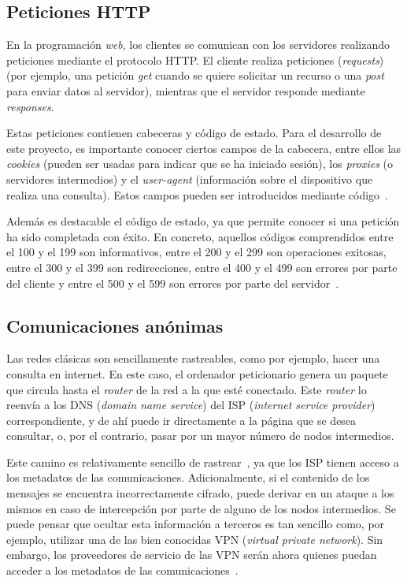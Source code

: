 \subsection{Peticiones HTTP}

En la programación \textit{web}, los clientes se comunican con los servidores realizando peticiones mediante el protocolo HTTP. El cliente realiza peticiones (\textit{requests}) (por ejemplo, una petición \textit{get} cuando se quiere solicitar un recurso o una \textit{post} para enviar datos al servidor), mientras que el servidor responde mediante \textit{responses}.

Estas peticiones contienen cabeceras y código de estado. Para el desarrollo de este proyecto, es importante conocer ciertos campos de la cabecera, entre ellos las \textit{cookies} (pueden ser usadas para indicar que se ha iniciado sesión), los \textit{proxies} (o servidores intermedios) y el \textit{user-agent} (información sobre el dispositivo que realiza una consulta). Estos campos pueden ser introducidos mediante código~\cite{httpHeaders}.

Además es destacable el código de estado, ya que permite conocer si una petición ha sido completada con éxito. En concreto, aquellos códigos comprendidos entre el 100 y el 199 son informativos, entre el 200 y el 299 son operaciones exitosas, entre el 300 y el 399 son redirecciones, entre el 400 y el 499 son errores por parte del cliente y entre el 500 y el 599 son errores por parte del servidor~\cite{httpStatus}.


\subsection{Comunicaciones anónimas}

Las redes clásicas son sencillamente rastreables, como por ejemplo, hacer una consulta en internet. En este caso, el ordenador peticionario genera un paquete que circula hasta el \textit{router} de la red a la que esté conectado. Este \textit{router} lo reenvía a los DNS (\textit{domain name service}) del ISP (\textit{internet service provider}) correspondiente, y de ahí puede ir directamente a la página que se desea consultar, o, por el contrario, pasar por un mayor número de nodos intermedios.

Este camino es relativamente sencillo de rastrear~\cite{TorAndrea2022}, ya que los ISP tienen acceso a los metadatos de las comunicaciones. Adicionalmente, si el contenido de los mensajes se encuentra incorrectamente cifrado, puede derivar en un ataque a los mismos en caso de intercepción por parte de alguno de los nodos intermedios. Se puede pensar que ocultar esta información a terceros es tan sencillo como, por ejemplo, utilizar una de las bien conocidas VPN (\textit{virtual private network}). Sin embargo, los proveedores de servicio de las VPN serán ahora quienes puedan acceder a los metadatos de las comunicaciones~\cite{TorKeepCoding2022}.


